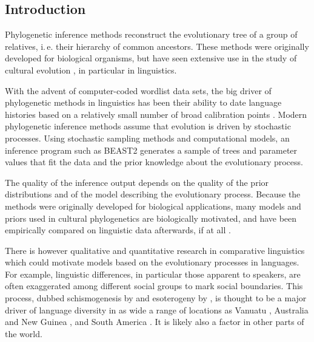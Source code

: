\documentclass[]{rsos}%
\begin{document}
\begin{fmtext}
\section{Introduction}
Phylogenetic inference methods reconstruct the e\-volu\-tion\-ary tree of a group of
relatives, i.\,e. their hierarchy of common ancestors.
These methods were originally developed for biological organisms, but have seen extensive
use in the study of cultural evolution \parencite{evans2021uses}, in particular in
linguistics.
\end{fmtext}
\maketitle
With the advent of computer-coded wordlist data sets, the big driver of
phylogenetic methods in linguistics has been their ability to date language
histories based on a relatively small number of broad calibration points
\parencite{borchsenius2017phylogenetics}.
Modern phylogenetic inference methods assume that evolution is driven by
stochastic processes. Using stochastic sampling methods and computational models,
an inference program such as BEAST2 \parencite{drummond2015bayesian}
generates a sample of trees and parameter values that fit the data and the prior knowledge
about the evolutionary process.

The quality of the inference output depends on the quality of the prior
distributions and of the model describing the evolutionary process. Because the
methods were originally developed for biological applications, many models and
priors used in cultural phylogenetics are biologically motivated, and have been
empirically compared on linguistic data afterwards, if at all
\parencite{kaiping2021systematic,rama2018three}.

There is however qualitative and quantitative research in comparative
linguistics which could motivate models based on the evolutionary processes in
languages. For example, linguistic differences, in particular those apparent to
speakers, are often exaggerated among different social groups to mark social
boundaries. This process, dubbed schismogenesis by \textcite{bateson1935culture}
and esoterogeny by \textcite{thurston1987processes}, is thought to be a major
driver of language diversity in as wide a range of locations as Vanuatu
\parencite{francois2011social}, Australia and New Guinea
\parencite{evans2019linguistic}, and South America
\parencite{epps2020amazonian}. It is likely also a factor in other parts of the
world.
\end{document}
